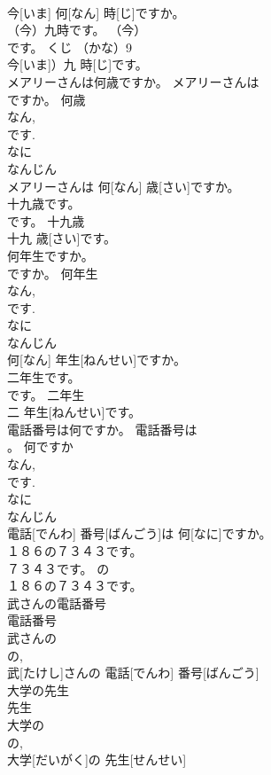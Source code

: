 \documentclass[8pt]{extreport}
\begin{document}
\begin{CJK}{UTF8}{min}
\\	今[いま] 何[なん] 時[じ]ですか。	
\\	（今）九時です。	（今）
\\	です。	くじ	（かな）9 
\\	今[いま]）九 時[じ]です。	
\\	メアリーさんは何歳ですか。	メアリーさんは
\\	ですか。	何歳	
\\	なん, 
\\	です. 
\\	なに 
\\	なんじん 
\\	メアリーさんは 何[なん] 歳[さい]ですか。	
\\	十九歳です。	
\\	です。	十九歳	
\\	十九 歳[さい]です。	
\\	何年生ですか。	
\\	ですか。	何年生	
\\	なん, 
\\	です. 
\\	なに 
\\	なんじん 
\\	何[なん] 年生[ねんせい]ですか。	
\\	二年生です。	
\\	です。	二年生	
\\	二 年生[ねんせい]です。	
\\	電話番号は何ですか。	電話番号は
\\	。	何ですか	
\\	なん, 
\\	です. 
\\	なに 
\\	なんじん 
\\	電話[でんわ] 番号[ばんごう]は 何[なに]ですか。	
\\	１８６の７３４３です。	
\\	７３４３です。	の	
\\	１８６の７３４３です。	
\\	武さんの電話番号	
\\	電話番号
\\	武さんの	
\\	の, 
\\	武[たけし]さんの 電話[でんわ] 番号[ばんごう]	
\\	大学の先生	
\\	先生
\\	大学の	
\\	の, 
\\	大学[だいがく]の 先生[せんせい]	

\end{CJK}
\end{document}
